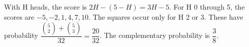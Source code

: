 With H heads, the score is $2 H-(5-H)=3 H-5$. For H 0 through 5, the scores are $-5,-2,1,4,7,10$. The squares occur only for H 2 or 3. These have probability $\dfrac{\binom 52+\binom 53}{32}=\dfrac{20}{32}$. The complementary probability is $\boxed{\dfrac{3}{8}}$.
